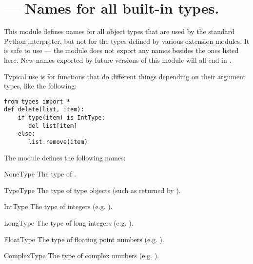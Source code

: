 \section{ ---
         Names for all built-in types.}




This module defines names for all object types that are used by the
standard Python interpreter, but not for the types defined by various
extension modules.  It is safe to use  ---
the module does not export any names besides the ones listed here.
New names exported by future versions of this module will all end in
.

Typical use is for functions that do different things depending on
their argument types, like the following:

\begin{verbatim}
from types import *
def delete(list, item):
    if type(item) is IntType:
       del list[item]
    else:
       list.remove(item)
\end{verbatim}

The module defines the following names:

\begin{datadesc}{NoneType}
The type of .
\end{datadesc}

\begin{datadesc}{TypeType}
The type of type objects (such as returned by
).
\end{datadesc}

\begin{datadesc}{IntType}
The type of integers (e.g. ).
\end{datadesc}

\begin{datadesc}{LongType}
The type of long integers (e.g. ).
\end{datadesc}

\begin{datadesc}{FloatType}
The type of floating point numbers (e.g. ).
\end{datadesc}

\begin{datadesc}{ComplexType}
The type of complex numbers (e.g. ).
\end{datadesc}

